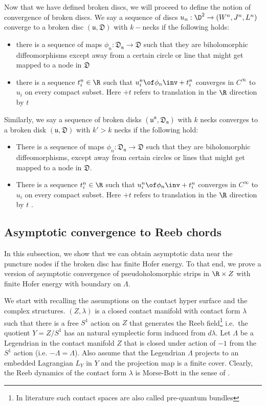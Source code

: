 Now that we have defined broken discs, we will proceed to define the notion of convergence of broken discs.
We say a sequence of discs $u_n : \D^2 \to (W^n,J^n,L^n)$ converge to a broken disc $(\mathfrak{u,D})$ with $k-$necks if the following holds: \begin{itemize}
    \item there is a sequence of maps $\phi_n:\mathfrak{D_n} \to \mathfrak{D} $ such that they are biholomorphic diffeomorphisms except away from a certain circle or line that might get mapped to a node in $\mathfrak{D}$
    \item there is a sequence $t^{n}_i \in \R$ such that $u^n_i \of \phi_n\inv+t^n_i$ converges in $C^{\infty}$ to $u_i$ on every compact subset. Here $+t$ refers to translation in the $\R$ direction by $t$ 
\end{itemize}

\noindent Similarly, we say a sequence of broken disks  $(\mathfrak{u^n,D_n})$ with $k$ necks converges to a broken disk $(\mathfrak{u,D})$ with $k'>k$ necks if the following hold:
\begin{itemize}
    \item There is a sequence of maps $\phi_n:\mathfrak{D_n} \to \mathfrak{D} $ such that they are biholomorphic diffeomorphisms, except away from certain circles or lines that might get mapped to a node in $\mathfrak{D}$.
    \item There is a sequence $t^{n}_i \in \R$ such that $u^n_i \of \phi_n\inv+t^n_i$ converges in $C^{\infty}$ to $u_i$ on every compact subset. Here $+t$ refers to translation in the $\R$ direction by $t$ .
  
\end{itemize}

\subsection{Asymptotic convergence to Reeb chords}

In this subsection, we show that we can obtain asymptotic data near the puncture nodes if the broken disc has finite Hofer energy. To that end, we prove a version of asymptotic convergence of pseudoholomorphic strips in $\R \times Z$ with finite Hofer energy  with boundary on $\Lambda$.

We start with recalling the assumptions on the contact hyper surface and the complex structures. $(Z,\lambda)$ is a closed contact manifold  with contact form $\lambda$ such that there is a free $S^1$ action on $Z$ that generates the Reeb field\footnote{In literature such contact spaces are also called pre-quantum bundles} i.e.\ the quotient $Y=Z/S^1$ has an natural symplectic form induced from $d\lambda$. Let $\Lambda$ be a Legendrian in the contact manifold $Z$ that is closed under action of  $-1$ from the $S^1$ action (i.e. $-\Lambda = \Lambda$). Also assume that the Legendrian $\Lambda$ projects to an embedded Lagrangian $L_Y$ in $Y$ and the projection map is a finite cover. Clearly, the Reeb dynamics of the contact form $\lambda$ is Morse-Bott in the sense of \cite{bourg}.


